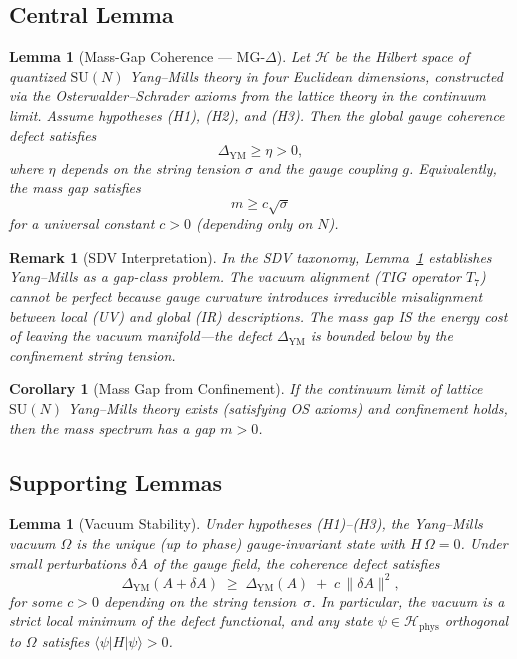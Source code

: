 \documentclass[11pt]{article}
\newtheorem{lemma}[theorem]{Lemma}
\newtheorem{corollary}[theorem]{Corollary}
\newtheorem{remark}[theorem]{Remark}
\begin{document}
\subsection{Central Lemma}

\begin{lemma}[Mass-Gap Coherence --- MG-$\Delta$]
\label{lem:MG-delta}
Let $\mathcal{H}$ be the Hilbert space of quantized $\mathrm{SU}(N)$
Yang--Mills theory in four Euclidean dimensions, constructed via the
Osterwalder--Schrader axioms from the lattice theory in the
continuum limit.  Assume hypotheses (H1), (H2), and (H3).  Then the
global gauge coherence defect satisfies
\begin{equation}\label{eq:mg-delta}
  \Delta_{\mathrm{YM}} \geq \eta > 0,
\end{equation}
where $\eta$ depends on the string tension $\sigma$ and the gauge
coupling $g$.  Equivalently, the mass gap satisfies
\begin{equation}\label{eq:mass-bound}
  m \geq c\sqrt{\sigma}
\end{equation}
for a universal constant $c > 0$ (depending only on $N$).
\end{lemma}

\begin{remark}[SDV Interpretation]
\label{rem:sdv-interp}
In the SDV taxonomy, Lemma~\ref{lem:MG-delta} establishes Yang--Mills
as a \emph{gap-class} problem.  The vacuum alignment (TIG operator
$T_7$) cannot be perfect because gauge curvature introduces irreducible
misalignment between local (UV) and global (IR) descriptions.  The mass
gap IS the energy cost of leaving the vacuum manifold---the defect
$\Delta_{\mathrm{YM}}$ is bounded below by the confinement string
tension.
\end{remark}

\begin{corollary}[Mass Gap from Confinement]
\label{cor:massgap}
If the continuum limit of lattice $\mathrm{SU}(N)$ Yang--Mills theory
exists (satisfying OS axioms) and confinement holds, then the mass
spectrum has a gap $m > 0$.
\end{corollary}

\subsection{Supporting Lemmas}

\begin{lemma}[Vacuum Stability]
\label{lem:vacuum-stability}
Under hypotheses \textup{(H1)--(H3)}, the Yang--Mills vacuum $\Omega$
is the unique (up to phase) gauge-invariant state with
$H\,\Omega = 0$.  Under small perturbations $\delta\!A$ of the gauge
field, the coherence defect satisfies
\begin{equation}\label{eq:vacuum-stability}
  \Delta_{\mathrm{YM}}(A + \delta\!A)
  \;\geq\;
  \Delta_{\mathrm{YM}}(A) \;+\; c\,\|\delta\!A\|^2,
\end{equation}
for some $c > 0$ depending on the string tension~$\sigma$.  In
particular, the vacuum is a \emph{strict local minimum} of the defect
functional, and any state $\psi \in \mathcal{H}_{\mathrm{phys}}$
orthogonal to $\Omega$ satisfies
$\langle\psi|H|\psi\rangle > 0$.
\end{lemma}
\end{document}
